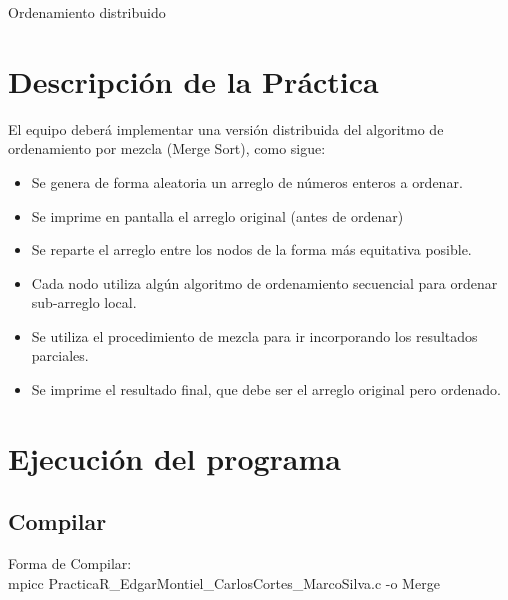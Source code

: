 \documentclass[a4paper,12pt]{article}
\begin{document}


\newpage

\begin{center}
    {\huge Ordenamiento distribuido}
\end{center}


\section*{Descripción de la Práctica}


El equipo deberá implementar una versión distribuida del algoritmo de ordenamiento por
mezcla (Merge Sort), como sigue:
\begin{itemize}
    \item Se genera de forma aleatoria un arreglo de números enteros a ordenar.
    \item Se imprime en pantalla el arreglo original (antes de ordenar)
    \item Se reparte el arreglo entre los nodos de la forma más equitativa posible.
    \item Cada nodo utiliza algún algoritmo de ordenamiento secuencial para ordenar sub-arreglo local.
    \item Se utiliza el procedimiento de mezcla para ir incorporando los resultados parciales.
    \item Se imprime el resultado final, que debe ser el arreglo original pero ordenado.
\end{itemize}



\section*{Ejecución del programa}

\subsection*{Compilar}
\begin{center}    
    Forma de Compilar:\\ 
    mpicc PracticaR_EdgarMontiel_CarlosCortes_MarcoSilva.c -o Merge
\end{center}
\end{document}
